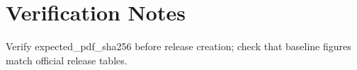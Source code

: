\section{Verification Notes}
Verify expected_pdf_sha256 before release creation; check that baseline figures match official release tables.

